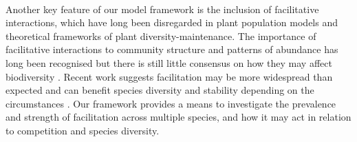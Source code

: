 \documentclass[a4,12pt]{article}
\begin{document}




        \paragraph{}
        Another key feature of our model framework is the inclusion of facilitative interactions, which have long been disregarded in plant population models and theoretical frameworks of plant diversity-maintenance. The importance of facilitative interactions to community structure and patterns of abundance has long been recognised \parencite{Callaway1997a} but there is still little consensus on how they may affect biodiversity \parencite{Bruno2003, Brooker2008a}. Recent work suggests facilitation may be more widespread than expected \parencite{Gross2015, Picoche2020} and can  benefit species diversity and stability depending on the circumstances \parencite{Coyte2015, Brooker2008}. Our framework provides a means to investigate the prevalence and strength of facilitation across multiple species, and how it may act in relation to competition and species diversity.  
        
\end{document}
